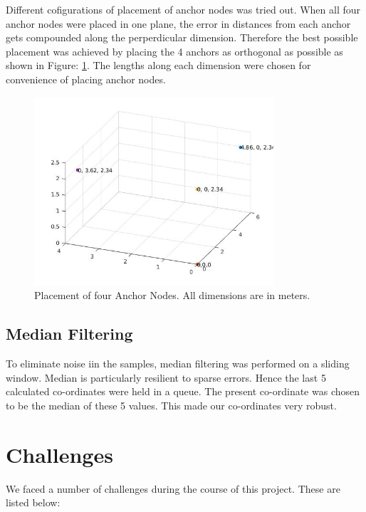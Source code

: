 \documentclass[journal,transmag]{IEEEtran}
\begin{document}
Different cofigurations of placement of anchor nodes was tried out. When all four anchor nodes were placed in one plane, the error in distances from each anchor gets compounded along the perperdicular dimension. Therefore the best possible placement was achieved by placing the 4 anchors as orthogonal as possible as shown in Figure: \ref{anchorplacement}. The lengths along each dimension were chosen for convenience of placing anchor nodes.

\begin{figure}[!h]
\centering
\includegraphics[width=3.5in]{anchorplacements3d.jpg}
\caption{{Placement of four Anchor Nodes. All dimensions are in meters.}}
\label{anchorplacement}
\end{figure}

\subsection{Median Filtering}

To eliminate noise iin the samples, median filtering was performed on a sliding window. Median is particularly resilient to sparse errors. Hence the last 5 calculated co-ordinates were held in a queue. The present co-ordinate was chosen to be the median of these 5 values. This made our co-ordinates very robust.

\section{Challenges}
We faced a number of challenges during the course of this project.  These are listed below: 
\end{document}

